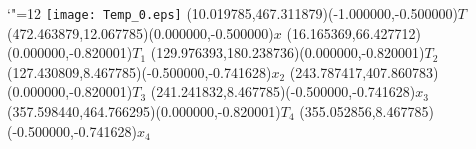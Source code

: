 \documentclass[12pt]{article}
\begin{document}
\makeatletter%
\let\ASYencoding\f@encoding%
\let\ASYfamily\f@family%
\let\ASYseries\f@series%
\let\ASYshape\f@shape%
\makeatother%
{\catcode`"=12%
\texttt{[image: Temp\_0.eps]}%
}%
\kern -480.642034pt%
\color{ASYcolor}
\fontsize{12.000000}{14.400000}\selectfont
\usefont{\ASYencoding}{\ASYfamily}{\ASYseries}{\ASYshape}%
\ASYalign(10.019785,467.311879)(-1.000000,-0.500000){$T$}%
\color{ASYcolor}
\fontsize{12.000000}{14.400000}\selectfont
\ASYalign(472.463879,12.067785)(0.000000,-0.500000){$x$}%
\color{ASYcolor}
\fontsize{12.000000}{14.400000}\selectfont
\ASYalign(16.165369,66.427712)(0.000000,-0.820001){$T_{1}$}%
\color{ASYcolor}
\fontsize{12.000000}{14.400000}\selectfont
\ASYalign(129.976393,180.238736)(0.000000,-0.820001){$T_{2}$}%
\color{ASYcolor}
\fontsize{12.000000}{14.400000}\selectfont
\ASYalign(127.430809,8.467785)(-0.500000,-0.741628){$x_{2}$}%
\color{ASYcolor}
\fontsize{12.000000}{14.400000}\selectfont
\ASYalign(243.787417,407.860783)(0.000000,-0.820001){$T_{3}$}%
\color{ASYcolor}
\fontsize{12.000000}{14.400000}\selectfont
\ASYalign(241.241832,8.467785)(-0.500000,-0.741628){$x_{3}$}%
\color{ASYcolor}
\fontsize{12.000000}{14.400000}\selectfont
\ASYalign(357.598440,464.766295)(0.000000,-0.820001){$T_{4}$}%
\color{ASYcolor}
\fontsize{12.000000}{14.400000}\selectfont
\ASYalign(355.052856,8.467785)(-0.500000,-0.741628){$x_{4}$}%
\end{document}
